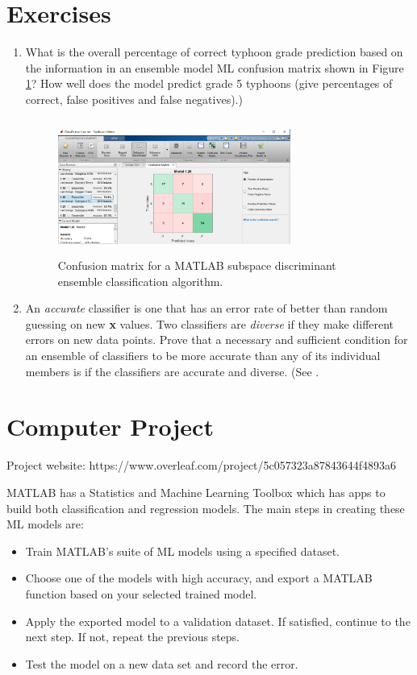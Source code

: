 \documentclass{SBCbookchapter}
\begin{document}
\newpage

\section{Exercises}  

\begin{enumerate}
	\item What is the overall percentage of correct typhoon grade prediction based on the information in an ensemble model ML confusion matrix shown in Figure \ref{EnsembleClass}? How well does the model predict grade 5 typhoons (give percentages of correct, false positives and false negatives).)
\begin{figure}[!htpb]
	\centering
	\includegraphics[width=3in,height=1.75in]{Ensemblefig1.png}
	\caption{Confusion matrix for a MATLAB subspace discriminant ensemble classification algorithm.}
	\label{EnsembleClass}
\end{figure}

\item An \emph{accurate} classifier is one that has an
error rate of better than random guessing on new {\bf x} values. Two classifiers are \emph{diverse} if they make different errors on new data points. Prove that a necessary and sufficient condition for an ensemble of classifiers to be more
accurate than any of its individual members is if the classifiers are accurate and
diverse. (See \cite{Hansen}.
 

\end{enumerate}
\newpage
\section{Computer Project}
{\flushleft Project website: 
https://www.overleaf.com/project/5c057323a87843644f4893a6}


MATLAB has a Statistics and Machine Learning Toolbox which has apps to build both classification and regression models.  The main steps in creating these ML models are:

\begin{itemize}
	\item Train MATLAB's suite of ML models using a specified dataset.
	\item Choose one of the models with high accuracy, and export a MATLAB function based on your selected trained model.
	\item Apply the exported model to a validation dataset.
	 If satisfied, continue to the next step. If not, repeat the previous steps.
	 \item Test the model on a new data set and record the error. 
	\end{itemize} 
\end{document}
